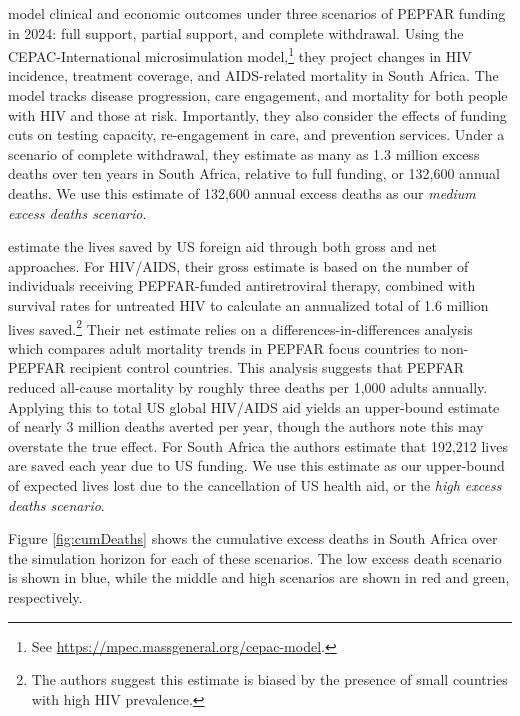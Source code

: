 \documentclass[letterpaper,12pt]{article}
\theoremstyle{definition}
\begin{document}
\begin{spacing}{1.5}
\citet{Gandhi2025} model clinical and economic outcomes under three scenarios of PEPFAR funding in 2024: full support, partial support, and complete withdrawal. Using the CEPAC-International microsimulation model,\footnote{See \href{https://mpec.massgeneral.org/cepac-model}{https://mpec.massgeneral.org/cepac-model}.} they project changes in HIV incidence, treatment coverage, and AIDS-related mortality in South Africa. The model tracks disease progression, care engagement, and mortality for both people with HIV and those at risk. Importantly, they also consider the effects of funding cuts on testing capacity, re-engagement in care, and prevention services. Under a scenario of complete withdrawal, they estimate as many as 1.3 million excess deaths over ten years in South Africa, relative to full funding, or 132,600 annual deaths. We use this estimate of 132,600 annual excess deaths as our \textit{medium excess deaths scenario}.

\citet{KS2025} estimate the lives saved by US foreign aid through both gross and net approaches. For HIV/AIDS, their gross estimate is based on the number of individuals receiving PEPFAR-funded antiretroviral therapy, combined with survival rates for untreated HIV to calculate an annualized total of 1.6 million lives saved.\footnote{The authors suggest this estimate is biased by the presence of small countries with high HIV prevalence.} Their net estimate relies on a differences-in-differences analysis which compares adult mortality trends in PEPFAR focus countries to non-PEPFAR recipient control countries. This analysis suggests that PEPFAR reduced all-cause mortality by roughly three deaths per 1,000 adults annually. Applying this to total US global HIV/AIDS aid yields an upper-bound estimate of nearly 3 million deaths averted per year, though the authors note this may overstate the true effect. For South Africa the authors estimate that 192,212 lives are saved each year due to US funding. We use this estimate as our upper-bound of expected lives lost due to the cancellation of US health aid, or the \textit{high excess deaths scenario}.

Figure \ref{fig:cumDeaths} shows the cumulative excess deaths in South Africa over the simulation horizon for each of these scenarios. The low excess death scenario is shown in blue, while the middle and high scenarios are shown in red and green, respectively.


\end{spacing}
\end{document}
